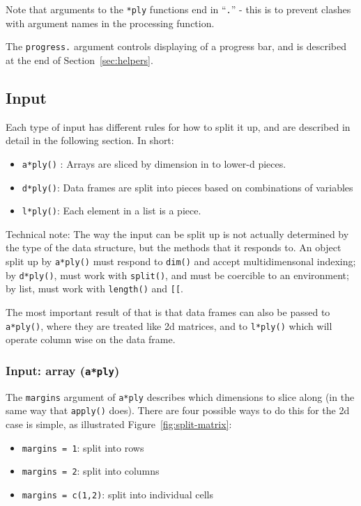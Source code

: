 \documentclass[letterpage]{scrartcl}
\newcommand{\code}[1]{\lstinline!#1!}
\newcommand{\f}[1]{\lstinline!#1()!}
\begin{document}
Note that arguments to the {\tt **ply} functions end in  ``{\tt .}'' - this is to prevent clashes with argument names in the processing function.

The {\tt progress.} argument controls displaying of a progress bar, and is described at the end of Section~\ref{sec:helpers}.

\subsection{Input} 
\label{sec:input}

Each type of input has different rules for how to split it up, and are described in detail in the following section. In short:

\begin{itemize}
  \item \f{a*ply} : Arrays are sliced by dimension in to lower-d pieces. 
  
  \item \f{d*ply}: Data frames are split into pieces based on combinations of variables
  
  \item \f{l*ply}: Each element in a list is a piece.
  
\end{itemize}

Technical note: The way the input can be split up is not actually determined by the type of the data structure, but the methods that it responds to.  An object split up by \f{a*ply} must respond to \f{dim} and accept multidimensonal indexing; by \f{d*ply}, must work with \f{split}, and must be coercible to an environment; by list, must work with \f{length} and \code{[[}.

The most important result of that is that data frames can also be passed to \f{a*ply}, where they are treated like 2d matrices, and to \f{l*ply} which will operate column wise on the data frame.

\subsubsection{Input: array ({\tt a*ply})}

The {\tt margins} argument of {\tt a*ply} describes which dimensions to slice along (in the same way that \f{apply} does).  There are four possible ways to do this for the 2d case is simple, as illustrated Figure~\ref{fig:split-matrix}:

\begin{itemize}
  \item \code{margins = 1}: split into rows
  \item \code{margins = 2}: split into columns
  \item \code{margins = c(1,2)}: split into individual cells
\end{itemize}
\end{document}
